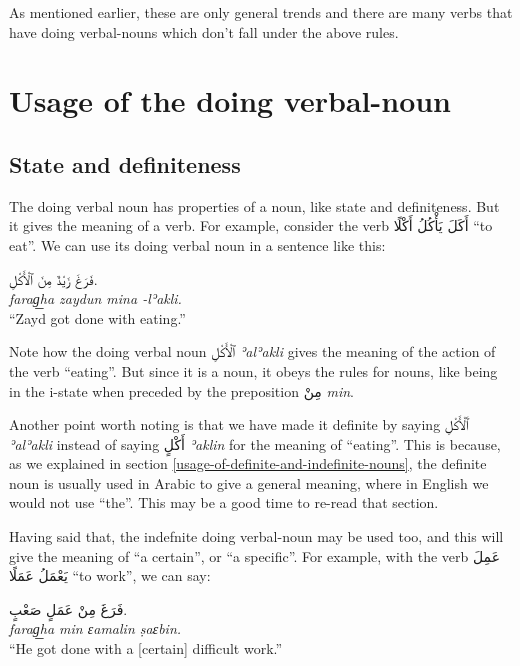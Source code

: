 \documentclass[
  10pt,
]{book}
\begin{document}
As mentioned earlier, these are only general trends and there are many verbs that have doing verbal-nouns which don't fall under the above rules.

\section{Usage of the doing verbal-noun}\label{usage-of-the-doing-verbal-noun}

\subsection{State and definiteness}\label{state-and-definiteness}

The doing verbal noun has properties of a noun, like state and definiteness. But it gives the meaning of a verb. For example, consider the verb \foreignlanguage{arabic}{أَکَلَ يَأْکُلُ أَکْلًا} \enquote{to eat}. We can use its doing verbal noun in a sentence like this:

\foreignlanguage{arabic}{فَرَغَ زَيْدٌ مِنَ ٱلْأَکْلِ.}\\
\emph{farag͟ha zaydun mina -lʾakli.}\\
\enquote{Zayd got done with eating.}

Note how the doing verbal noun \foreignlanguage{arabic}{ٱلْأَکْلِ} \emph{ʾalʾakli} gives the meaning of the action of the verb \enquote{eating}. But since it is a noun, it obeys the rules for nouns, like being in the i-state when preceded by the preposition \foreignlanguage{arabic}{مِنْ} \emph{min}.

Another point worth noting is that we have made it definite by saying \foreignlanguage{arabic}{ٱَلْأَکْلِ} \emph{ʾalʾakli} instead of saying \foreignlanguage{arabic}{أَکْلٍ} \emph{ʾaklin} for the meaning of \enquote{eating}. This is because, as we explained in section
\ref{usage-of-definite-and-indefinite-nouns},
the definite noun is usually used in Arabic to give a general meaning, where in English we would not use \enquote{the}. This may be a good time to re-read that section.

Having said that, the indefnite doing verbal-noun may be used too, and this will give the meaning of \enquote{a certain}, or \enquote{a specific}. For example, with the verb \foreignlanguage{arabic}{عَمِلَ يَعْمَلُ عَمَلًا} \enquote{to work}, we can say:

\foreignlanguage{arabic}{فَرَغَ مِنْ عَمَلٍ صَعْبٍ.}\\
\emph{farag͟ha min ɛamalin ṣaɛbin.}\\
\enquote{He got done with a {[}certain{]} difficult work.}
\end{document}
